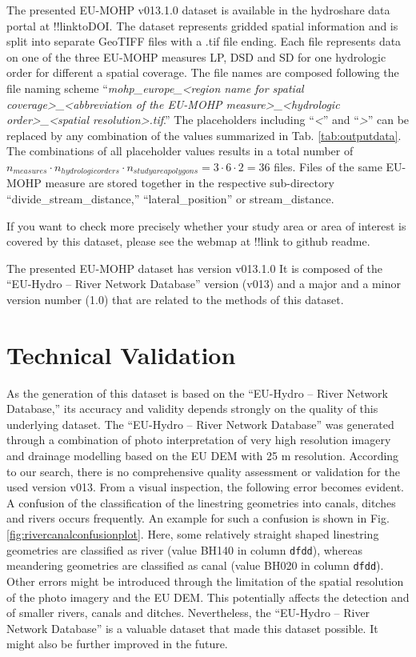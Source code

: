 \documentclass[fleqn,10pt]{wlscirep}
\begin{document}
The presented EU-MOHP v013.1.0 dataset is available in the hydroshare data portal at !!linktoDOI. The dataset represents gridded spatial information and is split into separate GeoTIFF files with a .tif file ending. Each file represents data on one of the three EU-MOHP measures LP, DSD and SD for one hydrologic order for different a spatial coverage. The file names are composed following the file naming scheme ``\emph{mohp\_europe\_\textless region name for spatial coverage\textgreater\_\textless abbreviation of the EU-MOHP measure\textgreater\_\textless hydrologic order\textgreater\_\textless spatial resolution\textgreater.tif}.'' The placeholders including ``\emph{\textless{}}'' and ``\emph{\textgreater{}}'' can be replaced by any combination of the values summarized in Tab. \ref{tab:outputdata}. The combinations of all placeholder values results in a total number of \(n_{measures}\cdot n_{hydrologic orders}\cdot n_{study area polygons} = 3\cdot 6\cdot 2 = 36\) files. Files of the same EU-MOHP measure are stored together in the respective sub-directory ``divide\_stream\_distance,'' ``lateral\_position'' or stream\_distance.

If you want to check more precisely whether your study area or area of interest is covered by this dataset, please see the webmap at !!link to github readme.

The presented EU-MOHP dataset has version v013.1.0 It is composed of the ``EU-Hydro -- River Network Database'' version (v013) and a major and a minor version number (1.0) that are related to the methods of this dataset.

\hypertarget{technical-validation}{%
\section*{Technical Validation}\label{technical-validation}}

As the generation of this dataset is based on the ``EU-Hydro -- River Network Database,'' its accuracy and validity depends strongly on the quality of this underlying dataset. The ``EU-Hydro -- River Network Database'' was generated through a combination of photo interpretation of very high resolution imagery and drainage modelling based on the EU DEM with 25 m resolution. According to our search, there is no comprehensive quality assessment or validation for the used version v013. From a visual inspection, the following error becomes evident. A confusion of the classification of the linestring geometries into canals, ditches and rivers occurs frequently. An example for such a confusion is shown in Fig. \ref{fig:rivercanalconfusionplot}. Here, some relatively straight shaped linestring geometries are classified as river (value BH140 in column \texttt{dfdd}), whereas meandering geometries are classified as canal (value BH020 in column \texttt{dfdd}). Other errors might be introduced through the limitation of the spatial resolution of the photo imagery and the EU DEM. This potentially affects the detection and of smaller rivers, canals and ditches. Nevertheless, the ``EU-Hydro -- River Network Database'' is a valuable dataset that made this dataset possible. It might also be further improved in the future.
\end{document}
